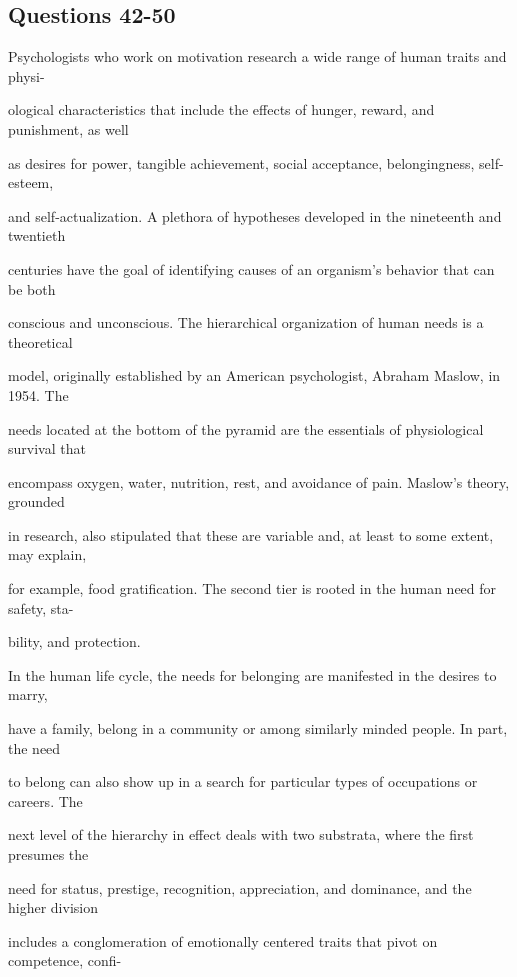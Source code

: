 \documentclass[12pt]{article}
\begin{document}
\subsection*{Questions 42-50}
\begingroup
\small
\sloppy
\setlength{\parskip}{0pt}
\setlength{\parindent}{0pt}
Psychologists who work on motivation research a wide range of human traits and physi-\par
ological characteristics that include the effects of hunger, reward, and punishment, as well\par
as desires for power, tangible achievement, social acceptance, belongingness, self-esteem,\par
and self-actualization. A plethora of hypotheses developed in the nineteenth and twentieth\par
centuries have the goal of identifying causes of an organism's behavior that can be both\par
conscious and unconscious. The hierarchical organization of human needs is a theoretical\par
model, originally established by an American psychologist, Abraham Maslow, in 1954. The\par
needs located at the bottom of the pyramid are the essentials of physiological survival that\par
encompass oxygen, water, nutrition, rest, and avoidance of pain. Maslow's theory, grounded\par
in research, also stipulated that these are variable and, at least to some extent, may explain,\par
for example, food gratification. The second tier is rooted in the human need for safety, sta-\par
bility, and protection.\par
In the human life cycle, the needs for belonging are manifested in the desires to marry,\par
have a family, belong in a community or among similarly minded people. In part, the need\par
to belong can also show up in a search for particular types of occupations or careers. The\par
next level of the hierarchy in effect deals with two substrata, where the first presumes the\par
need for status, prestige, recognition, appreciation, and dominance, and the higher division\par
includes a conglomeration of emotionally centered traits that pivot on competence, confi-\par
\end{document}

